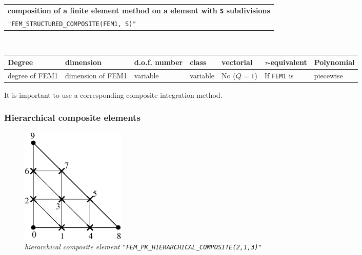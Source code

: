 \documentclass[10pt,a4paper]{article}
\begin{document}
\begin{center}
\begin{tabular}{|m{16.109cm}|} \hline 
{\bf composition of a finite element method on a element with {\tt S} subdivisions}\\
{\tt "FEM\_STRUCTURED\_COMPOSITE(FEM1, S)"} 
\end{tabular} \\ \vspace{-1pt} 
\begin{tabular}{|m{2cm}|m{2cm}|m{2.5cm}|m{1.5cm}|m{1.5cm}|m{2cm}|m{2cm}|} \hline 
Degree & dimension & d.o.f. number & class & vectorial & \mbox{$\tau$-equivalent} & Polynomial\\ \hline
\small degree of FEM1 & \small dimension of FEM1 & variable & variable & No \mbox{($Q = 1$)} & If {\tt FEM1} is  & piecewise\\ \hline
\end{tabular}
\end{center}

It is important to use a corresponding composite integration method.

\subsubsection{Hierarchical composite elements}

\begin{figure}[H]
  \begin{center}
    \includegraphics[width=5cm,angle=0]{getfemlist_triangle_P1comp_hier.eps}
  \end{center}
  \caption{ \it hierarchical composite element {\tt "FEM\_PK\_HIERARCHICAL\_COMPOSITE(2,1,3)"}} 
  \label{fig:triangle_comp}
\end{figure}
\end{document}
